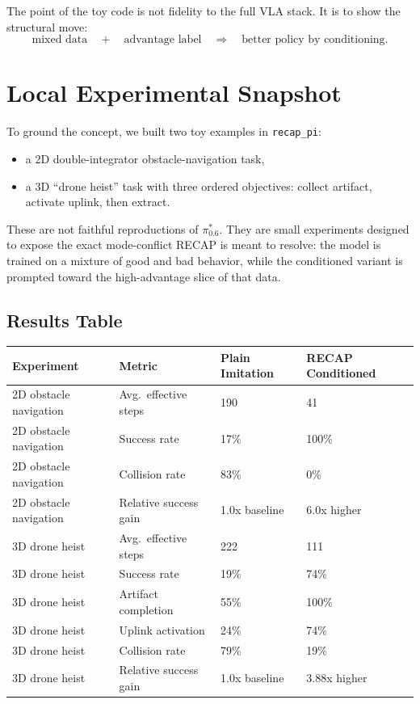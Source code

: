 \documentclass[11pt]{article}
\begin{document}
The point of the toy code is not fidelity to the full VLA stack. It is to show the structural move:
\[
\text{mixed data} \quad + \quad \text{advantage label} \quad \Longrightarrow \quad \text{better policy by conditioning.}
\]

\section{Local Experimental Snapshot}

To ground the concept, we built two toy examples in \texttt{recap\_pi}:
\begin{itemize}[leftmargin=1.5em]
  \item a 2D double-integrator obstacle-navigation task,
  \item a 3D ``drone heist'' task with three ordered objectives: collect artifact, activate uplink, then extract.
\end{itemize}

These are not faithful reproductions of \(\pi^{*}_{0.6}\). They are small experiments designed to expose the exact mode-conflict RECAP is meant to resolve: the model is trained on a mixture of good and bad behavior, while the conditioned variant is prompted toward the high-advantage slice of that data.

\subsection{Results Table}

\begin{center}
\begin{longtable}{@{}llll@{}}
\toprule
\textbf{Experiment} & \textbf{Metric} & \textbf{Plain Imitation} & \textbf{RECAP Conditioned} \\
\midrule
\endhead
2D obstacle navigation & Avg.\ effective steps & 190 & 41 \\
2D obstacle navigation & Success rate & 17\% & 100\% \\
2D obstacle navigation & Collision rate & 83\% & 0\% \\
2D obstacle navigation & Relative success gain & 1.0x baseline & 6.0x higher \\
\midrule
3D drone heist & Avg.\ effective steps & 222 & 111 \\
3D drone heist & Success rate & 19\% & 74\% \\
3D drone heist & Artifact completion & 55\% & 100\% \\
3D drone heist & Uplink activation & 24\% & 74\% \\
3D drone heist & Collision rate & 79\% & 19\% \\
3D drone heist & Relative success gain & 1.0x baseline & 3.88x higher \\
\bottomrule
\end{longtable}
\end{center}
\end{document}
